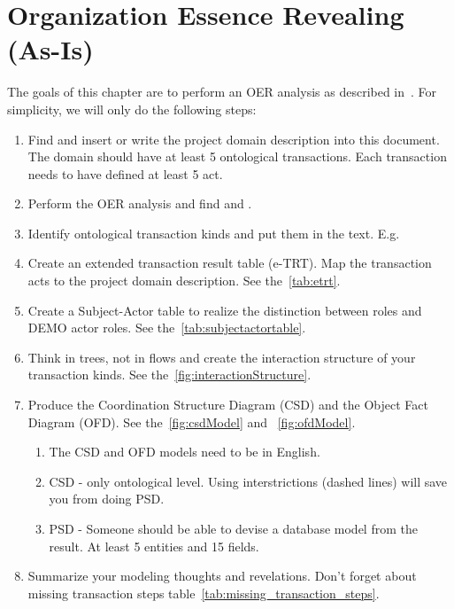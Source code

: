 \chapter{Organization Essence Revealing (As-Is)}

The goals of this chapter are to perform an OER analysis as described in~\cite{dietz2015teoo,dietz2020enterprise}. For simplicity, we will only do the following steps: 

\begin{enumerate}
    \item Find and insert or write the project domain description into this document. The domain should have at least 5 ontological transactions. Each transaction needs to have defined at least 5 act. 
    \item Perform the OER analysis and find  and . 
    \item Identify ontological transaction kinds and put them in the text. E.g. \oact{[TK1/rq]} 
    \item Create an extended transaction result table (e-TRT). Map the transaction acts to the project domain description. See the~\cref{tab:etrt}. 
    \item Create a Subject-Actor table to realize the distinction between roles and DEMO actor roles. See the~\cref{tab:subjectactortable}. 
    \item Think in trees, not in flows and create the interaction structure of your transaction kinds. See the~\cref{fig:interactionStructure}.  
    \item Produce the Coordination Structure Diagram (CSD) and the Object Fact Diagram (OFD). See the~\cref{fig:csdModel} and ~\cref{fig:ofdModel}.  
    \begin{enumerate}
        \item The CSD and OFD models need to be in English.
        \item CSD - only ontological level. Using interstrictions (dashed lines) will save you from doing PSD. 
        \item PSD - Someone should be able to devise a database model from the result. At least 5 entities and 15 fields. 
    \end{enumerate}
    \item Summarize your modeling thoughts and revelations. Don't forget about missing transaction steps table~\cref{tab:missing_transaction_steps}.
\end{enumerate}

